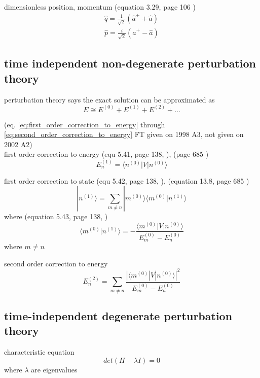 \documentclass[12pt]{article}  %
\def\qualifyingyear{F}
\begin{document}
dimensionless position, momentum (equation 3.29, page 106 \cite{ParrisQM})
\begin{equation}
\begin{gathered}
\hat{q} = \frac{1}{\sqrt{2}} (\hat{a}^+ + \hat{a}) \\ 
\hat{p} = \frac{i}{\sqrt{2}} (\hat{a}^+ - \hat{a})
\label{eq:q_p_dimensionless}
\end{gathered}
\end{equation}

\subsection{time independent non-degenerate perturbation theory}
perturbation theory says the exact solution can be approximated as
\begin{equation}
E \cong E^{(0)} + E^{(1)} + E^{(2)} + \ldots
\end{equation}

(eq. \ref{eq:first_order_correction_to_energy} through \ref{eq:second_order_correction_to_energy} 
\if\qualifyingyear T
given on 1998 A3, not given on 2002 A2) \\ 
\fi
first order correction to energy (equ 5.41, page 138, \cite{ParrisQM}), (page 685 \cite{LiboffQM})
\begin{equation}
E^{(1)}_n = \langle n^{(0)} |V|n^{(0)}\rangle
\label{eq:first_order_correction_to_energy}
\end{equation}

first order correction to state (equ 5.42, page 138, \cite{ParrisQM}), (equation 13.8, page 685 \cite{LiboffQM})
\begin{equation}
|n^{(1)}\rangle = \sum_{m \neq n} | m^{(0)}\rangle \langle m^{(0)} |n^{(1)}\rangle
\end{equation}
where (equation 5.43, page 138, \cite{ParrisQM})
\begin{equation}
\langle m^{(0)} |n^{(1)}\rangle = -\frac{\langle m^{(0)}|V|n^{(0)}\rangle}{E_m^{(0)} - E_n^{(0)}}
\end{equation}
where $m\neq n$

second order correction to energy 
\begin{equation}
E_n^{(2)} = \sum_{m\neq n} \frac{ | \langle m^{(0)}|V|n^{(0)}\rangle |^2 }{E_m^{(0)} - E_n^{(0)}}
\label{eq:second_order_correction_to_energy}
\end{equation}

\subsection{time-independent degenerate perturbation theory}
characteristic equation
\begin{equation}
det(H - \lambda I) = 0
\label{eq:characteristic_equation}
\end{equation}
where $\lambda$ are eigenvalues
\end{document}
